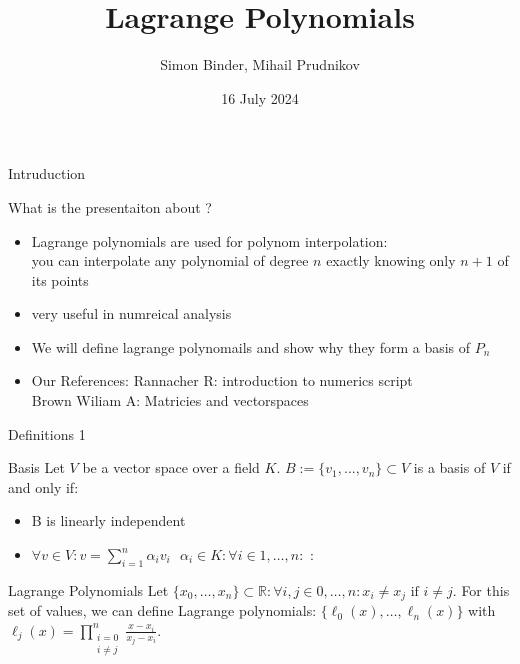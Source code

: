 \documentclass[8pt]{beamer}
\title{Lagrange Polynomials}
\date{16 July 2024}
\author{Simon Binder, Mihail Prudnikov}
\begin{document}
	\begin{frame}[plain]
		\maketitle
	\end{frame}
	
	\begin{frame}{Intruduction}
		\begin{block}{What is the presentaiton about ?}
			\begin{itemize}
				\item
				Lagrange polynomials are used for polynom interpolation:\\
				you can interpolate any polynomial of degree $n$ exactly knowing only $n+1$ of its points
				\item
				very useful in numreical analysis
				\item
				We will define lagrange polynomails and show why they form a basis of $P_n$
				\item
				Our References: Rannacher R: introduction to numerics script \\ Brown Wiliam A: Matricies and vectorspaces
			
			\end{itemize}
		\end{block}
	\end{frame}
	
	\begin{frame}{Definitions 1}
		\begin{block}{Basis}
			Let $V$ be a vector space over a field $K$. $B :=\{ v_1, \ldots, v_n\}\subset V $ is a basis of $V$ if and only if:
			\begin{itemize}
				\item B is linearly independent
				\item
				 $\forall v \in V:  v = \sum_{i=1}^{n}\alpha_i v_i\text{   } \alpha_i \in K:\forall i\in 1,\ldots,n:$ : 
			\end{itemize}\cite{basis}
		\end{block}
		\begin{block}{Lagrange Polynomials}
			Let $\{x_0, \ldots, x_n \} \subset \mathbb{R}: \forall i,j \in 0, \ldots ,n: x_i \neq x_j \text{ if } i \neq j$. For this set of values, we can define Lagrange polynomials: $\{\ell_0(x), \ldots, \ell_n(x)\}$ with \\ $\ell_j(x) = 
			\displaystyle \prod_{\substack{i= 0 \\ i \neq j }}^{n}\frac{x - x_i}{x_j - x_i}$. \cite{lagrange}
		\end{block}
	\end{frame}
	
\end{document}
